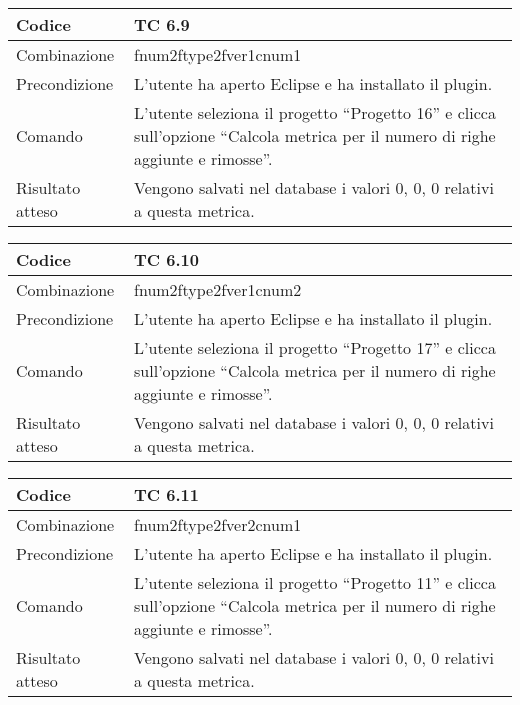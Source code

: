 \begin{table}[ht]
\begin{tabular}{|p{3cm}|p{9cm}|}
\hline
\cellcolor{lightgray}Codice				& TC 6.9								\\
\hline
\cellcolor{lightgray}Combinazione		& fnum2ftype2fver1cnum1									\\
\hline
\cellcolor{lightgray}Precondizione		& L'utente ha aperto Eclipse e ha installato il plugin.		\\
\hline
\cellcolor{lightgray}Comando			& L'utente seleziona il progetto ``Progetto 16''  e clicca sull'opzione ``Calcola metrica per il numero di righe aggiunte e rimosse''.	\\
\hline
\cellcolor{lightgray}Risultato atteso	& Vengono salvati nel database i valori 0, 0, 0 relativi a questa metrica.\\
\hline
\end{tabular}
\end{table}

\begin{table}[ht]
\begin{tabular}{|p{3cm}|p{9cm}|}
\hline
\cellcolor{lightgray}Codice				& TC 6.10								\\
\hline
\cellcolor{lightgray}Combinazione		& fnum2ftype2fver1cnum2 									\\
\hline
\cellcolor{lightgray}Precondizione		& L'utente ha aperto Eclipse e ha installato il plugin.				\\
\hline
\cellcolor{lightgray}Comando			& L'utente seleziona il progetto ``Progetto 17''  e clicca sull'opzione ``Calcola metrica per il numero di righe aggiunte e rimosse''.	\\
\hline
\cellcolor{lightgray}Risultato atteso	& Vengono salvati nel database i valori 0, 0, 0 relativi a questa metrica.\\
\hline
\end{tabular}
\end{table}

\clearpage

\begin{table}[ht]
\begin{tabular}{|p{3cm}|p{9cm}|}
\hline
\cellcolor{lightgray}Codice				& TC 6.11								\\
\hline
\cellcolor{lightgray}Combinazione		& fnum2ftype2fver2cnum1									\\
\hline
\cellcolor{lightgray}Precondizione		& L'utente ha aperto Eclipse e ha installato il plugin.					\\
\hline
\cellcolor{lightgray}Comando			& L'utente seleziona il progetto ``Progetto 11''  e clicca sull'opzione ``Calcola metrica per il numero di righe aggiunte e rimosse''.	\\
\hline
\cellcolor{lightgray}Risultato atteso	& Vengono salvati nel database i valori 0, 0, 0 relativi a questa metrica.\\
\hline
\end{tabular}
\end{table}

